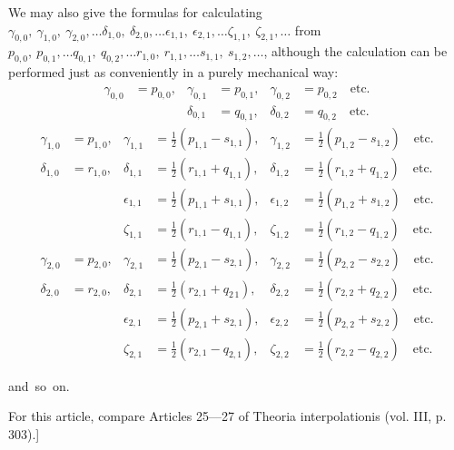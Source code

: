 \begin{landscape}
\par\noindent\hspace*{\parindent}We may also give the formulas for calculating \(\gamma_{0,0},\allowbreak\ \gamma_{1,0},\allowbreak\ \gamma_{2,0},\allowbreak\ldots\delta_{1,0},\allowbreak\ \delta_{2,0},\allowbreak\ldots\epsilon_{1,1},\allowbreak\ \epsilon_{2,1},\allowbreak\ldots\zeta_{1,1},\allowbreak\ \zeta_{2,1},\allowbreak\ldots\) from \(p_{0,0},\allowbreak\ p_{0,1},\allowbreak\ldots q_{0,1},\allowbreak\ q_{0,2},\allowbreak\ldots r_{1,0},\allowbreak\ r_{1,1},\allowbreak\ldots s_{1,1},\allowbreak\ s_{1,2},\allowbreak\ldots\), although the calculation can be performed just as conveniently in a purely mechanical way:
\[
\begin{aligned}
\gamma_{0,0}&=p_{0,0},&\gamma_{0,1}&=p_{0,1},&\gamma_{0,2}&=p_{0,2}\quad\text{etc.}\\
&&\delta_{0,1}&=q_{0,1},&\delta_{0,2}&=q_{0,2}\quad\text{etc.}
\end{aligned}
\]
\[
\begin{aligned}
\gamma_{1,0}&=p_{1,0},&\gamma_{1,1}&=\tfrac12(p_{1,1}-s_{1,1}),&\gamma_{1,2}&=\tfrac12(p_{1,2}-s_{1,2})\quad\text{etc.}\\
\delta_{1,0}&=r_{1,0},&\delta_{1,1}&=\tfrac12(r_{1,1}+q_{1,1}),&\delta_{1,2}&=\tfrac12(r_{1,2}+q_{1,2})\quad\text{etc.}\\[8pt]
&&\epsilon_{1,1}&=\tfrac12(p_{1,1}+s_{1,1}),&\epsilon_{1,2}&=\tfrac12(p_{1,2}+s_{1,2})\quad\text{etc.}\\
&&\zeta_{1,1}&=\tfrac12(r_{1,1}-q_{1,1}),&\zeta_{1,2}&=\tfrac12(r_{1,2}-q_{1,2})\quad\text{etc.}\\[8pt]
\gamma_{2,0}&=p_{2,0},&\gamma_{2,1}&=\tfrac12(p_{2,1}-s_{2,1}),&\gamma_{2,2}&=\tfrac12(p_{2,2}-s_{2,2})\quad\text{etc.}\\
\delta_{2,0}&=r_{2,0},&\delta_{2,1}&=\tfrac12(r_{2,1}+q_{2\,1}),&\delta_{2,2}&=\tfrac12(r_{2,2}+q_{2,2})\quad\text{etc.}\\[8pt]
&&\epsilon_{2,1}&=\tfrac12(p_{2,1}+s_{2,1}),&\epsilon_{2,2}&=\tfrac12(p_{2,2}+s_{2,2})\quad\text{etc.}\\
&&\zeta_{2,1}&=\tfrac12(r_{2,1}-q_{2,1}),&\zeta_{2,2}&=\tfrac12(r_{2,2}-q_{2,2})\quad\text{etc.}
\end{aligned}
\]
\begin{center}and~so~on.\end{center}
\par\noindent\hspace*{\parindent}For this article, compare Articles 25---27 of Theoria interpolationis (vol. III, p. 303).]
\clearpage
\endgroup
\end{landscape}
